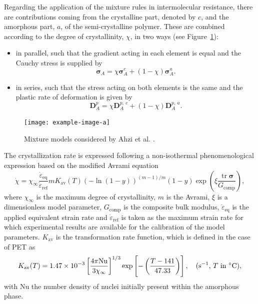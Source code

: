 Regarding the application of the mixture rules in intermolecular resistance, there are contributions coming from the crystalline part, denoted by $c$, and the amorphous part, $a$, of the semi-crystalline polymer.
These are combined according to the degree of crystallinity, $\chi$, in two ways (see Figure~\ref{fig:ahzi_combiniations}):
\begin{itemize}
	\item in parallel, such that the gradient acting in each element is equal and the Cauchy stress is supplied by
	\begin{equation}
		\bm\sigma_A = \chi\bm\sigma_A^c + (1 -\chi)\bm\sigma_A^a.
	\end{equation}
	\item in series, such that the stress acting on both elements is the same and the plastic rate of deformation is given by
	\begin{equation}
		\mathbf D^p_A = \chi \mathbf D^{p,\ c}_A + (1 -\chi)\mathbf D^{p,\ a}_A.
	\end{equation}
\end{itemize}
\begin{figure}
	\centering
	\texttt{[image: example-image-a]}
	\caption{Mixture models considered by Ahzi et al. \citep{ahziModelingDeformationBehavior2003}.}
\label{fig:ahzi_combiniations}
\end{figure}
The crystallization rate is expressed following a non-isothermal phenomenological expression based on the modiﬁed Avrami equation
\begin{equation}
	\dot \chi = \chi_\infty \frac{\dot\varepsilon_\text{eq}}{\dot\varepsilon_\text{ref} } m K_\text{av}(T) (-\ln(1-y))^{(m-1)/m} (1-y)\exp\left(\xi\frac{\operatorname{tr} \bm \sigma}{G_\text{comp}}\right),
\end{equation}
where $\chi_\infty$ is the maximum degree of crystallinity, $m$ is the Avrami, $\xi$ is a dimensionless model parameter, $G_\text{comp}$ is the composite bulk modulus, $\dot \varepsilon_\text{eq}$ is the applied equivalent strain rate and $\dot\varepsilon_\text{ref}$ is taken as the maximum strain rate for which experimental results are available for the calibration of the model parameters.
$K_\text{av}$ is the transformation rate function, which is defined in the case of PET as
\begin{equation}
	K_\text{av}(T) = 1.47\times 10^{-3} \left[\frac{4\pi \mathrm{Nu}}{3\chi_\infty}\right]^{1/3} \exp\left[-\left(\frac{T - 141}{47.33}\right)\right], \quad \text{(\si{\per\second}, $T$ in \si{\celsius})},
\end{equation}
with $\mathrm{Nu}$ the number density of nuclei initially present within the amorphous phase.

